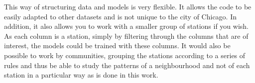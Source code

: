 This way of structuring data and models is very flexible. It allows the code to be easily adapted to other datasets and is not unique to the city of Chicago. In addition, it also allows you to work with a smaller group of stations if you wish. As each column is a station, simply by filtering through the columns that are of interest, the models could be trained with these columns. It would also be possible to work by communities, grouping the stations according to a series of rules and thus be able to study the patterns of a neighbourhood and not of each station in a particular way as is done in this work.
\newline
